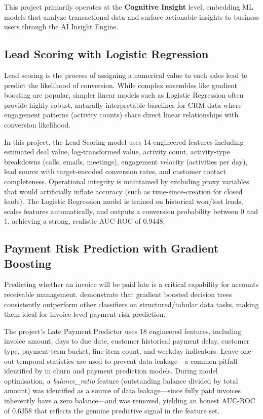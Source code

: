 \documentclass[12pt,a4paper]{report}
\begin{document}
This project primarily operates at the \textbf{Cognitive Insight} level, embedding ML models that analyze transactional data and surface actionable insights to business users through the AI Insight Engine.

\subsection{Lead Scoring with Logistic Regression}

Lead scoring is the process of assigning a numerical value to each sales lead to predict the likelihood of conversion. While complex ensembles like gradient boosting are popular, simpler linear models such as Logistic Regression often provide highly robust, naturally interpretable baselines for CRM data where engagement patterns (activity counts) share direct linear relationships with conversion likelihood.

In this project, the Lead Scoring model uses 14 engineered features including estimated deal value, log-transformed value, activity count, activity-type breakdowns (calls, emails, meetings), engagement velocity (activities per day), lead source with target-encoded conversion rates, and customer contact completeness. Operational integrity is maintained by excluding proxy variables that would artificially inflate accuracy (such as time-since-creation for closed leads). The Logistic Regression model is trained on historical won/lost leads, scales features automatically, and outputs a conversion probability between 0 and 1, achieving a strong, realistic AUC-ROC of 0.9448.

\subsection{Payment Risk Prediction with Gradient Boosting}

Predicting whether an invoice will be paid late is a critical capability for accounts receivable management. \citet{chen2016xgboost} demonstrate that gradient boosted decision trees consistently outperform other classifiers on structured/tabular data tasks, making them ideal for invoice-level payment risk prediction.

The project's Late Payment Predictor uses 18 engineered features, including invoice amount, days to due date, customer historical payment delay, customer type, payment-term bucket, line-item count, and weekday indicators. Leave-one-out temporal statistics are used to prevent data leakage---a common pitfall identified by \citet{provost2013data} in churn and payment prediction models. During model optimisation, a \textit{balance\_ratio} feature (outstanding balance divided by total amount) was identified as a source of data leakage---since fully paid invoices inherently have a zero balance---and was removed, yielding an honest AUC-ROC of 0.6358 that reflects the genuine predictive signal in the feature set.
\end{document}
